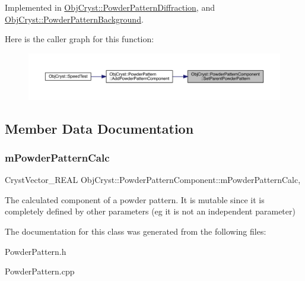 Implemented in \mbox{\hyperlink{class_obj_cryst_1_1_powder_pattern_diffraction_ab72aa94beafb9f7081c0cc5e9adc7050}{Obj\+Cryst\+::\+Powder\+Pattern\+Diffraction}}, and \mbox{\hyperlink{class_obj_cryst_1_1_powder_pattern_background_a74b0128b9f2c6be0302f67e132ed4aed}{Obj\+Cryst\+::\+Powder\+Pattern\+Background}}.

Here is the caller graph for this function\+:
\nopagebreak
\begin{figure}[H]
\begin{center}
\leavevmode
\includegraphics[width=350pt]{class_obj_cryst_1_1_powder_pattern_component_a6b3dc911118c280dbbdcb7fb97acf980_icgraph}
\end{center}
\end{figure}


\subsection{Member Data Documentation}
\mbox{\label{class_obj_cryst_1_1_powder_pattern_component_ae6e41d0a85e00cdf0a7d52f74dc20d4a}} 
\subsubsection{\texorpdfstring{mPowderPatternCalc}{mPowderPatternCalc}}
{\footnotesize\ttfamily Cryst\+Vector\+\_\+\+R\+E\+AL Obj\+Cryst\+::\+Powder\+Pattern\+Component\+::m\+Powder\+Pattern\+Calc\hspace{0.3cm}{\ttfamily [mutable]}, {\ttfamily [protected]}}

The calculated component of a powder pattern. It is mutable since it is completely defined by other parameters (eg it is not an \textquotesingle{}independent parameter\textquotesingle{}) 

The documentation for this class was generated from the following files\+:\begin{DoxyCompactItemize}
\item 
Powder\+Pattern.\+h\item 
Powder\+Pattern.\+cpp\end{DoxyCompactItemize}

